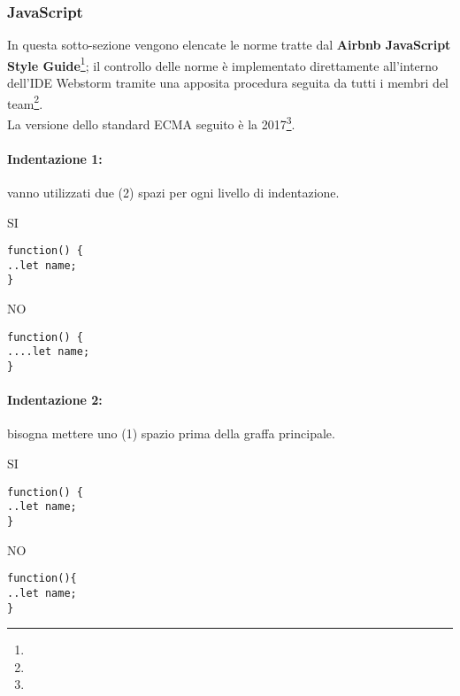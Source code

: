 \documentclass[../ProcessiPrimari.tex]{subfiles}
\begin{document}
	
	\subsubsection{JavaScript}
	In questa sotto-sezione vengono elencate le norme tratte dal \textbf{Airbnb JavaScript Style Guide}\footnote{}; il controllo delle norme è implementato direttamente all'interno dell'IDE Webstorm tramite una apposita procedura seguita da tutti i membri del team\footnote{}.\\
	La versione dello standard ECMA seguito è la 2017\footnote{}.
	
	\paragraph*{Indentazione 1: }
	vanno utilizzati due (2) spazi per ogni livello di indentazione.
	
	\begin{center}{
	\begin{minipage}{4cm}
		{\begin{center}SI\end{center}}
		\begin{Verbatim}[frame=single]
function() {
..let name;
}
		\end{Verbatim}
	\end{minipage}
	\hfil
	\begin{minipage}{4cm}
		{\begin{center}NO\end{center}}
		\begin{Verbatim}[frame=single]
function() {
....let name;
}
		\end{Verbatim}
	\end{minipage}
	}
	\end{center}
	
	\paragraph*{Indentazione 2: }
	bisogna mettere uno (1) spazio prima della graffa principale.	
	\begin{center}{	
	\begin{minipage}{4cm}
		{\begin{center}SI\end{center}}
		\begin{Verbatim}[frame=single]
function() {
..let name;
}
		\end{Verbatim}
	\end{minipage}
	\hfil
	\begin{minipage}{4cm}
		{\begin{center}NO\end{center}}
		\begin{Verbatim}[frame=single]
function(){
..let name;
}
		\end{Verbatim}
	\end{minipage}
	}
	\end{center}	
\end{document}
